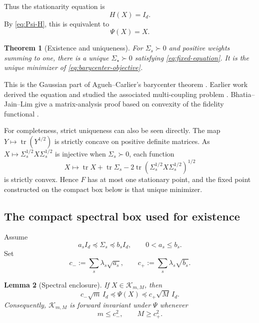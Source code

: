 \documentclass[11pt]{article}
\newtheorem{theorem}{Theorem}[section]
\newtheorem{lemma}[theorem]{Lemma}
\theoremstyle{definition}
\newcommand{\Id}{I_d}
\newcommand{\tr}{\operatorname{tr}}
\newcommand{\cK}{\mathcal K}
\begin{document}
Thus the stationarity equation is
\begin{equation}\label{eq:stationarity-H}
 H(X)=\Id.
\end{equation}
By \eqref{eq:Psi-H}, this is equivalent to
\begin{equation}\label{eq:fixed-equation}
 \boxed{\Psi(X)=X.}
\end{equation}

\begin{theorem}[Existence and uniqueness]\label{thm:exist-unique}
For $\Sigma_s\succ0$ and positive weights summing to one, there is a unique
$\Sigma_\star\succ0$ satisfying \eqref{eq:fixed-equation}.  It is the unique
minimizer of \eqref{eq:barycenter-objective}.
\end{theorem}

This is the Gaussian part of Agueh--Carlier's barycenter theorem
\cite[Theorem 6.1]{AguehCarlier2011}.  Earlier work derived the equation and
studied the associated multi-coupling problem
\cite{KnottSmith1994,RuschendorfUckelmann2002}.  Bhatia--Jain--Lim give a
matrix-analysis proof based on convexity of the fidelity functional
\cite{BhatiaJainLim2019}.

For completeness, strict uniqueness can also be seen directly.  The map
$Y\mapsto\tr(Y^{1/2})$ is strictly concave on positive definite matrices.  As
$X\mapsto\Sigma_s^{1/2}X\Sigma_s^{1/2}$ is injective when
$\Sigma_s\succ0$, each function
\[
 X\longmapsto \tr X+\tr\Sigma_s
 -2\tr(\Sigma_s^{1/2}X\Sigma_s^{1/2})^{1/2}
\]
is strictly convex.  Hence $F$ has at most one stationary point, and the
fixed point constructed on the compact box below is that unique minimizer.

\subsection{The compact spectral box used for existence}

Assume
\begin{equation}\label{eq:data-bounds}
 a_s\Id\preceq\Sigma_s\preceq b_s\Id,
 \qquad 0<a_s\leq b_s.
\end{equation}
Set
\begin{equation}\label{eq:cpm}
 c_-:=\sum_s\lambda_s\sqrt{a_s},\qquad
 c_+:=\sum_s\lambda_s\sqrt{b_s}.
\end{equation}

\begin{lemma}[Spectral enclosure]\label{lem:spectral-enclosure}
If $X\in\cK_{m,M}$, then
\begin{equation}\label{eq:image-box}
 c_-\sqrt m\,\Id\preceq\Psi(X)
 \preceq c_+\sqrt M\,\Id.
\end{equation}
Consequently, $\cK_{m,M}$ is forward invariant under $\Psi$ whenever
\begin{equation}\label{eq:invariance-condition}
 m\leq c_-^2,\qquad M\geq c_+^2.
\end{equation}
\end{lemma}
\end{document}
